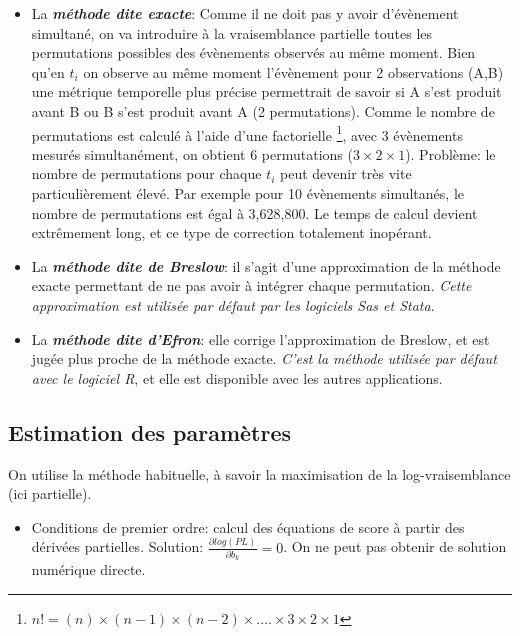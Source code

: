 \documentclass[
  12pt,
  letterpaper,
  DIV=11,
  numbers=noendperiod,
  onepage,
  openany]{scrreprt}
\providecommand{\tightlist}{%
  \setlength{\itemsep}{0pt}\setlength{\parskip}{0pt}}\usepackage{longtable,booktabs,array}
\begin{document}
\begin{itemize}
\item
  La \textbf{\emph{méthode dite exacte}}: Comme il ne doit pas y avoir
  d'évènement simultané, on va introduire à la vraisemblance partielle
  toutes les permutations possibles des évènements observés au même
  moment. Bien qu'en \(t_i\) on observe au même moment l'évènement pour
  2 observations (A,B) une métrique temporelle plus précise permettrait
  de savoir si A s'est produit avant B ou B s'est produit avant A (2
  permutations). Comme le nombre de permutations est calculé à l'aide
  d'une factorielle \footnote{\(n! = (n)\times(n-1)\times(n-2)\times....\times3\times2\times1\)},
  avec 3 évènements mesurés simultanément, on obtient 6 permutations
  (\(3\times2\times1\)). Problème: le nombre de permutations pour chaque
  \(t_i\) peut devenir très vite particulièrement élevé. Par exemple
  pour 10 évènements simultanés, le nombre de permutations est égal à
  3,628,800. Le temps de calcul devient extrêmement long, et ce type de
  correction totalement inopérant.
\item
  La \textbf{\emph{méthode dite de Breslow}}: il s'agit d'une
  approximation de la méthode exacte permettant de ne pas avoir à
  intégrer chaque permutation. \emph{Cette approximation est utilisée
  par défaut par les logiciels Sas et Stata}.
\item
  La \textbf{\emph{méthode dite d'Efron}}: elle corrige l'approximation
  de Breslow, et est jugée plus proche de la méthode exacte. \emph{C'est
  la méthode utilisée par défaut avec le logiciel R}, et elle est
  disponible avec les autres applications.
\end{itemize}

\hypertarget{estimation-des-paramuxe8tres}{%
\subsection{Estimation des
paramètres}\label{estimation-des-paramuxe8tres}}

On utilise la méthode habituelle, à savoir la maximisation de la
log-vraisemblance (ici partielle).

\begin{itemize}
\tightlist
\item
  Conditions de premier ordre: calcul des équations de score à partir
  des dérivées partielles. Solution:
  \(\frac{\partial log(PL)}{\partial{b_k}}=0\). On ne peut pas obtenir
  de solution numérique directe.
\end{itemize}
\end{document}
